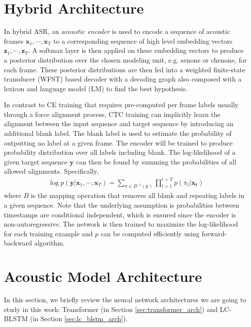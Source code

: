 \documentclass[a4paper]{article}
\begin{document}
\section{Hybrid Architecture}
\label{sec:hybrid}
In hybrid ASR, an \emph{acoustic encoder} is used to encode a sequence of acoustic frames $\boldsymbol{x}_1, \cdots, \boldsymbol{x}_T$ to a corresponding sequence of high level embedding vectors $\boldsymbol{z}_1, \cdots, \boldsymbol{z}_T$. A softmax layer is then applied on these embedding vectors to produce a posterior distribution over the chosen modeling unit, e.g. senone or chenone, for each frame. These posterior distributions are then fed into a weighted finite-state transducer (WFST)\cite{mohri2002weighted} based decoder with a decoding graph also composed with a lexicon and language model (LM) to find the best hypothesis. 

In contrast to CE training that requires pre-computed per frame labels usually through a force alignment process, CTC training can implicitly learn the alignment between the input sequence and target sequence by introducing an additional blank label. The blank label is used to estimate the probability of outputting no label at a given frame. The encoder will be trained to produce probability distribution over all labels including blank. The log-likelihood of a given target sequence $\boldsymbol{y}$ can then be found by summing the probabilities of all allowed alignments. Specifically, 
\begin{align}
    \log p(\boldsymbol{y}|\boldsymbol{x}_1, \cdots, \boldsymbol{x}_T) = \sum_{\pi \in B^{-1}(\boldsymbol{y}) }\prod_{t=1}^{t=T}{p(\pi_t|\boldsymbol{x_t})}
\end{align}
where $B$ is the mapping operation that removes all blank and repeating labels in a given sequence. Note that the underlying assumption is probabilities between timestamps are conditional independent, which is ensured since the encoder is non-autoregressive. The network is then trained to maximize the log-likelihood for each training example and $p$ can be computed efficiently using forward-backward algorithm.

\section{Acoustic Model Architecture}
\label{sec:am}
In this section, we briefly review the neural network architectures we are going to study in this work: Transformer (in Section \ref{sec:transformer_arch}) and LC-BLSTM (in Section \ref{sec:lc_blstm_arch}).
\end{document}
